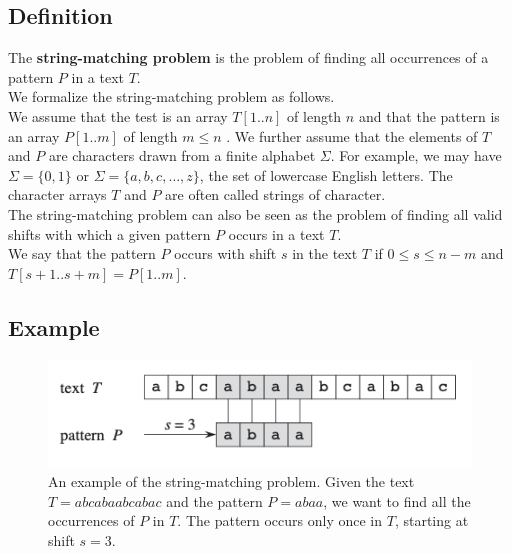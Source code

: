 \documentclass[11pt]{article}
\begin{document}
        \subsection{Definition} \label{subsec:definition}

            The \textbf{string-matching problem} is the problem of finding all occurrences of a pattern $P$ in a text $T$. \\

            \noindent We formalize the string-matching problem as follows. \\
            We assume that the test is an array $T[1..n]$ of length $n$ and that the pattern is an array $P[1..m]$ of length $m \leq n$ .
            We further assume that the elements of $T$ and $P$ are characters drawn from a finite alphabet $\Sigma$.
            For example, we may have $\Sigma = \{0, 1\}$ or $\Sigma = \{a, b, c, \dots, z\}$, the set of lowercase English letters.
            The character arrays $T$ and $P$ are often called strings of character. \\

            \noindent The string-matching problem can also be seen as the problem of finding all valid shifts with which a given pattern $P$ occurs in a text $T$. \\
            We say that the pattern $P$ occurs with shift $s$ in the text $T$ if $0 \leq s \leq n - m$ and $T[s+1..s+m] = P[1..m]$.

        \subsection{Example} \label{subsec:example}

            \begin{figure}[H]
                \centering
                \includegraphics[width = 0.7 \textwidth]{Figure 2.1}
                \caption{An example of the string-matching problem.
                         Given the text $T = abcabaabcabac$ and the pattern $P = abaa$, we want to find all the occurrences of $P$ in $T$.
                         The pattern occurs only once in $T$, starting at shift $s = 3$.}
                \label{fig:example}
            \end{figure}
\end{document}
